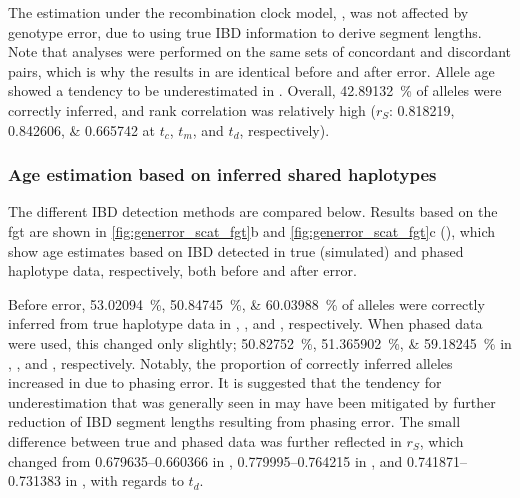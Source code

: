 The estimation under the recombination clock model, \ClockR, was not affected by genotype error, due to using true IBD information to derive segment lengths.
Note that analyses were performed on the same sets of concordant and discordant pairs, which is why the results in \ClockR are identical before and after error.
Allele age showed a tendency to be underestimated in \ClockR.
Overall, \SI{42.89132}{\percent} of alleles were correctly inferred,
and rank correlation was relatively high
($r_S$: \numlist{0.818219;0.842606;0.665742} at $t_c$, $t_m$, and $t_d$, respectively).


%
\subsubsection{Age estimation based on inferred shared haplotypes}
%

The different IBD detection methods are compared below.
Results based on the \gls{fgt} are shown in
\cref{fig:generror_scat_fgt}{b} and \ref{fig:generror_scat_fgt}{c} (), which show age estimates based on IBD detected in true (simulated) and phased haplotype data, respectively, both before and after error.

%

%

Before error, \SIlist{53.02094;50.84745;60.03988}{\percent} of alleles were correctly inferred from true haplotype data in \ClockM, \ClockR, and \ClockC, respectively.
When phased data were used, this changed only slightly; \SIlist{50.82752;51.365902;59.18245}{\percent} in \ClockM, \ClockR, and \ClockC, respectively.
Notably, the proportion of correctly inferred alleles increased in \ClockR due to phasing error.
It is suggested that the tendency for underestimation that was generally seen in \ClockR may have been mitigated by further reduction of IBD segment lengths resulting from phasing error.
The small difference between true and phased data was further reflected in $r_S$, which changed from \numrange{0.679635}{0.660366} in \ClockM, \numrange{0.779995}{0.764215} in \ClockR, and \numrange{0.741871}{0.731383} in \ClockC, with regards to $t_d$.

